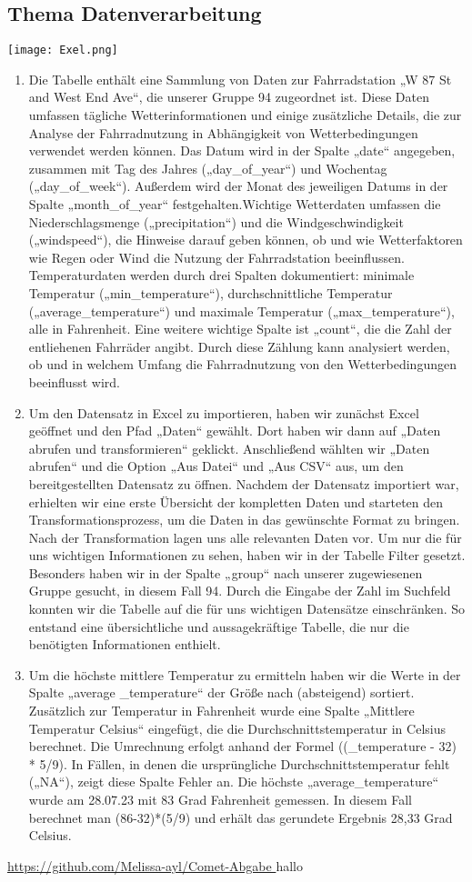 \documentclass{article}
\begin{document}
\subsection{Thema Datenverarbeitung}
\texttt{[image: Exel.png]}
\begin{enumerate}
 \item Die Tabelle enthält eine Sammlung von Daten zur Fahrradstation „W 87 St and West End Ave“, die unserer Gruppe 94 zugeordnet ist. Diese Daten umfassen tägliche Wetterinformationen und einige zusätzliche Details, die zur Analyse der Fahrradnutzung in Abhängigkeit von Wetterbedingungen verwendet werden können.
Das Datum wird in der Spalte „date“ angegeben, zusammen mit Tag des Jahres („day\_of\_year“) und Wochentag („day\_of\_week“). Außerdem wird der Monat des jeweiligen Datums in der Spalte „month\_of\_year“ festgehalten.Wichtige Wetterdaten umfassen die Niederschlagsmenge („precipitation“) und die Windgeschwindigkeit („windspeed“), die Hinweise darauf geben können, ob und wie Wetterfaktoren wie Regen oder Wind die Nutzung der Fahrradstation beeinflussen. Temperaturdaten werden durch drei Spalten dokumentiert: minimale Temperatur („min\_temperature“), durchschnittliche Temperatur („average\_temperature“) und maximale Temperatur („max\_temperature“), alle in Fahrenheit. 
Eine weitere wichtige Spalte ist „count“, die die Zahl der entliehenen Fahrräder angibt. Durch diese Zählung kann analysiert werden, ob und in welchem Umfang die Fahrradnutzung von den Wetterbedingungen beeinflusst wird.
\item Um den Datensatz in Excel zu importieren, haben wir zunächst Excel geöffnet und den Pfad „Daten“ gewählt. Dort haben wir dann auf „Daten abrufen und transformieren“ geklickt. Anschließend wählten wir „Daten abrufen“ und die Option „Aus Datei“ und „Aus CSV“ aus, um den bereitgestellten Datensatz zu öffnen.
Nachdem der Datensatz importiert war, erhielten wir eine erste Übersicht der kompletten Daten und starteten den Transformationsprozess, um die Daten in das gewünschte Format zu bringen. Nach der Transformation lagen uns alle relevanten Daten vor.
Um nur die für uns wichtigen Informationen zu sehen, haben wir in der Tabelle Filter gesetzt. Besonders haben wir in der Spalte „group“ nach unserer zugewiesenen Gruppe gesucht, in diesem Fall 94. Durch die Eingabe der Zahl im Suchfeld konnten wir die Tabelle auf die für uns wichtigen Datensätze einschränken. So entstand eine übersichtliche und aussagekräftige Tabelle, die nur die benötigten Informationen enthielt.
\item Um die höchste mittlere Temperatur zu ermitteln haben wir die Werte in der Spalte „average _temperature“ der Größe nach (absteigend) sortiert. 
Zusätzlich zur Temperatur in Fahrenheit wurde eine Spalte „Mittlere Temperatur Celsius“ eingefügt, die die Durchschnittstemperatur in Celsius berechnet. Die Umrechnung erfolgt anhand der Formel ((\_temperature - 32) * 5/9). In Fällen, in denen die ursprüngliche Durchschnittstemperatur fehlt („NA“), zeigt diese Spalte Fehler an. Die höchste „average\_temperature“ wurde am 28.07.23 mit 83 Grad Fahrenheit gemessen. In diesem Fall berechnet man (86-32)*(5/9) und erhält das gerundete Ergebnis 28,33 Grad Celsius.
\end{enumerate}
\newpage





\url{https://github.com/Melissa-ayl/Comet-Abgabe }
hallo
\end{document}
